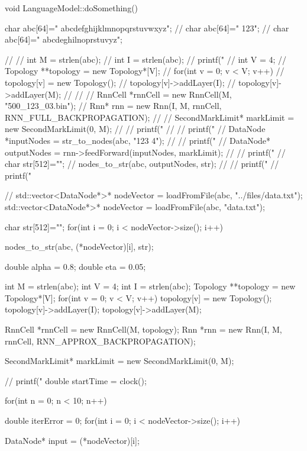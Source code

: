 void LanguageModel::doSomething(){

   char abc[64]=" abcdefghijklmnopqrstuvwxyz";
   // char abc[64]=" 123";
   // char abc[64]=" abcdeghilnoprstuvyz";

  //
  // int M = strlen(abc);
  // int I = strlen(abc);
  // printf("%
  // int V = 4;
  // Topology **topology = new Topology*[V];
  // for(int v = 0; v < V; v++){
  //   topology[v] = new Topology();
  //   topology[v]->addLayer(I);
  //   topology[v]->addLayer(M);
  // }
  //
  // RnnCell *rnnCell = new RnnCell(M, "500_123_03.bin");
  // Rnn* rnn = new Rnn(I, M, rnnCell, RNN_FULL_BACKPROPAGATION);
  //
  // SecondMarkLimit* markLimit = new SecondMarkLimit(0, M);
  //   // printf("%
  //     // printf("%
  // DataNode *inputNodes = str_to_nodes(abc, "123 4");
  //   // printf("%
  // DataNode* outputNodes = rnn->feedForward(inputNodes, markLimit);
  //   // printf("%
  // char str[512]="";
  // nodes_to_str(abc, outputNodes, str);
  //
  // printf("%
  // printf("%






  // std::vector<DataNode*>* nodeVector = loadFromFile(abc, "../files/data.txt");
  std::vector<DataNode*>* nodeVector = loadFromFile(abc, "data.txt");



  char str[512]="";
  for(int i = 0; i < nodeVector->size(); i++){
    nodes_to_str(abc, (*nodeVector)[i], str);

  }



  double alpha = 0.8;
  double eta = 0.05;

  int M = strlen(abc);
  int V = 4;
  int I = strlen(abc);
  Topology **topology = new Topology*[V];
  for(int v = 0; v < V; v++){
    topology[v] = new Topology();
    topology[v]->addLayer(I);
    topology[v]->addLayer(M);
  }

  RnnCell *rnnCell = new RnnCell(M, topology);
  Rnn *rnn = new Rnn(I, M, rnnCell, RNN_APPROX_BACKPROPAGATION);

  SecondMarkLimit* markLimit = new SecondMarkLimit(0, M);

  // printf("%
  double startTime = clock();

  for(int n = 0; n < 10; n++){
    double iterError = 0;
    for(int i = 0; i < nodeVector->size(); i++){
      DataNode* input = (*nodeVector)[i];


}}}
